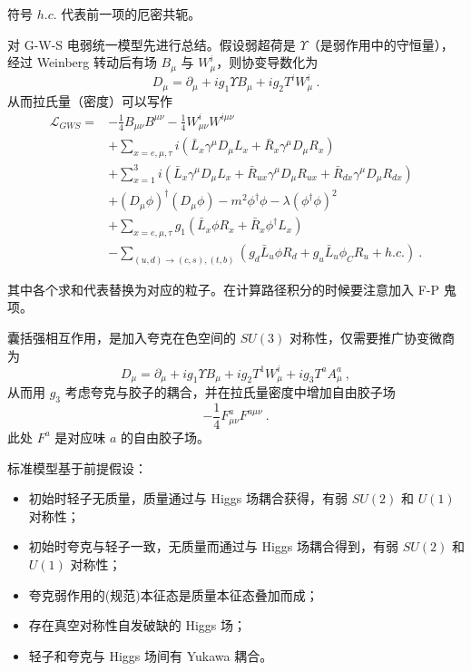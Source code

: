 
\begin{issues}
\issueMissDepend
\issueAbstract
\end{issues}

符号 $h.c.$ 代表前一项的厄密共轭。

对 G-W-S 电弱统一模型先进行总结。假设弱超荷是 $\Upsilon$（是弱作用中的守恒量），经过 Weinberg 转动后有场 $B_\mu$ 与 $W^i_\mu$，则协变导数化为 
\begin{equation}
D_\mu = \partial_\mu + i g_1 \Upsilon B_\mu + i g_2 T^i W_\mu^i~.
\end{equation}
从而拉氏量（密度）可以写作 
\begin{equation}
	\begin{aligned}
		\mathcal L_{GWS} =& -\frac{1}{4} B_{\mu\nu} B^{\mu\nu} - \frac{1}{4} W_{\mu\nu}^i W^{i\mu\nu}\\
		&+ \sum_{x = e, \mu, \tau} i \left(\bar{L}_x \gamma^\mu D_\mu L_x + \bar{R}_x \gamma^\mu D_\mu R_x\right)\\
		&+ \sum_{x=1}^3 i \left(\bar{L}_{x} \gamma^\mu D_\mu L_x + \bar{R}_{ux} \gamma^\mu D_\mu R_{ux} + \bar{R}_{dx} \gamma^\mu D_\mu R_{dx}\right) \\
		&+(D_\mu \phi)^\dagger (D_\mu \phi) - m^2 \phi^\dagger \phi - \lambda (\phi^\dagger \phi)^2 \\
		&+ \sum_{x = e, \mu, \tau} g_1 \left(\bar{L}_x \phi R_x + \bar{R}_x \phi^\dagger L_x\right) \\
		&- \sum_{(u, d) \to (c, s), (t, b)} \left(g_d \bar{L}_u \phi R_d + g_u \bar{L}_u \phi_C R_u + h.c.\right) ~.
	\end{aligned}
\end{equation}

其中各个求和代表替换为对应的粒子。在计算路径积分的时候要注意加入 F-P 鬼项。

囊括强相互作用，是加入夸克在色空间的 $SU(3)$ 对称性，仅需要推广协变微商为 
\begin{equation}
	D_\mu = \partial_\mu + i g_1 \Upsilon B_\mu + i g_2 T^1 W_\mu^i + i g_3 T^a A^a_\mu ~,
\end{equation}
从而用 $g_3$ 考虑夸克与胶子的耦合，并在拉氏量密度中增加自由胶子场
\begin{equation}
	-\frac14 F_{\mu\nu}^a F^{a\mu\nu} ~.
\end{equation}
此处 $F^a$ 是对应味 $a$ 的自由胶子场。

标准模型基于前提假设：
\begin{itemize}
	\item 初始时轻子无质量，质量通过与 Higgs 场耦合获得，有弱 $SU(2)$ 和 $U(1)$ 对称性；
	\item 初始时夸克与轻子一致，无质量而通过与 Higgs 场耦合得到，有弱 $SU(2)$ 和 $U(1)$ 对称性；
	\item 夸克弱作用的(规范)本征态是质量本征态叠加而成；
	\item 存在真空对称性自发破缺的 Higgs 场；
	\item 轻子和夸克与 Higgs 场间有 Yukawa 耦合。
\end{itemize}